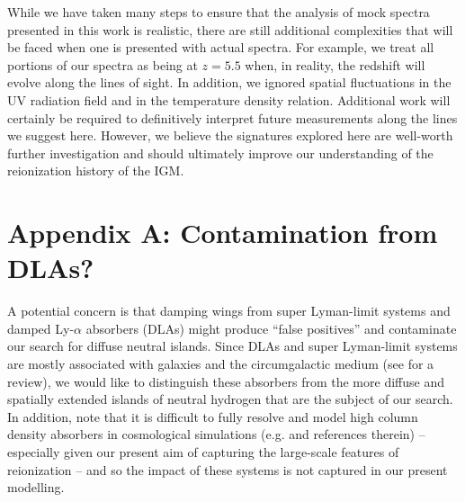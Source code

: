While we have taken many steps to ensure that the analysis of mock spectra presented in this work is realistic, there are still additional complexities that will be faced when one is presented with actual spectra. For example, we treat all portions of our spectra as being at $z = 5.5$ when, in reality, the redshift will evolve along the lines of sight. In addition, we ignored spatial fluctuations in the UV
radiation field and in the temperature density relation. Additional work will certainly be required to definitively interpret future measurements along the lines we suggest here.
However, we believe the signatures explored here are well-worth further investigation and should ultimately improve our understanding of the reionization history of the IGM.



\section*{Appendix A: Contamination from DLAs?} \label{sec:DLA_contam}


A potential concern is that damping wings from super Lyman-limit systems
and damped Ly-$\alpha$ absorbers (DLAs) might produce ``false positives'' and
contaminate our search for diffuse neutral islands.
Since DLAs
and super Lyman-limit systems are mostly associated with galaxies and the
circumgalactic medium (see \citealt{Wolfe:2005jd} for a review), we would like to distinguish these absorbers 
from the more
diffuse and spatially extended islands of neutral hydrogen that are the
subject of our search. In addition, note that it is difficult to fully resolve and model high column density absorbers
in cosmological simulations (e.g. \citealt{Rahmati:2013hsa} and references therein) -- especially given our present aim of capturing the large-scale features
of reionization -- and so the impact of these systems is not captured in our present modelling.

